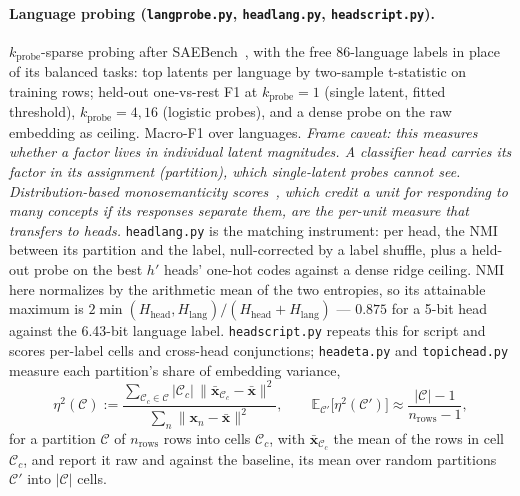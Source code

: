 \paragraph{Language probing (\texttt{langprobe.py}, \texttt{headlang.py},
\texttt{headscript.py}).}
$k_{\mathrm{probe}}$-sparse probing after SAEBench~\cite{karvonen2025},
with the free 86-language labels in place of its balanced tasks: top
latents per language by two-sample t-statistic on
training rows; held-out one-vs-rest F1 at $k_{\mathrm{probe}}{=}1$ (single
latent, fitted threshold), $k_{\mathrm{probe}}{=}4,16$ (logistic probes),
and a dense probe on the raw embedding as
ceiling. Macro-F1 over languages. \emph{Frame caveat: this measures
whether a factor lives in individual latent magnitudes. A classifier head
carries its factor in its assignment (partition), which single-latent
probes cannot see. Distribution-based monosemanticity
scores~\cite{fereidouni2025evaluatingsparseautoencodersmonosemantic}, which
credit a unit for responding to many concepts if its responses separate
them, are the per-unit measure that transfers to heads.}
\texttt{headlang.py} is the matching instrument: per
head, the NMI between its partition and the label, null-corrected by a
label shuffle, plus a held-out probe on the best $h'$ heads' one-hot
codes against a dense ridge ceiling. NMI here normalizes by the
arithmetic mean of the two entropies, so its attainable maximum is
$2\min(H_{\mathrm{head}},H_{\mathrm{lang}})/(H_{\mathrm{head}}+H_{\mathrm{lang}})$
--- $0.875$ for a 5-bit head against the
6.43-bit language label. \texttt{headscript.py} repeats this for script
and scores per-label cells and cross-head conjunctions;
\texttt{headeta.py} and \texttt{topichead.py} measure each partition's
share of embedding variance,
\begin{equation}
	\eta^2(\mathcal{C}) := \frac{\sum_{\mathcal{C}_c \in \mathcal{C}} \lvert\mathcal{C}_c\rvert\,
	                       \lVert \bar{\mathbf{x}}_{\mathcal{C}_c} - \bar{\mathbf{x}}\rVert^2}
	                  {\sum_n \lVert \mathbf{x}_n - \bar{\mathbf{x}}\rVert^2},
	\qquad
	\mathbb{E}_{\mathcal{C}'}\big[\eta^2(\mathcal{C}')\big] \approx
	\frac{\lvert\mathcal{C}\rvert-1}{n_{\mathrm{rows}}-1},
	\label{eq:eta}
\end{equation}
for a partition $\mathcal{C}$ of $n_{\mathrm{rows}}$ rows into cells
$\mathcal{C}_c$, with $\bar{\mathbf{x}}_{\mathcal{C}_c}$ the mean of the
rows in cell $\mathcal{C}_c$, and report it raw and against the baseline,
its mean over random partitions $\mathcal{C}'$ into
$\lvert\mathcal{C}\rvert$ cells.


